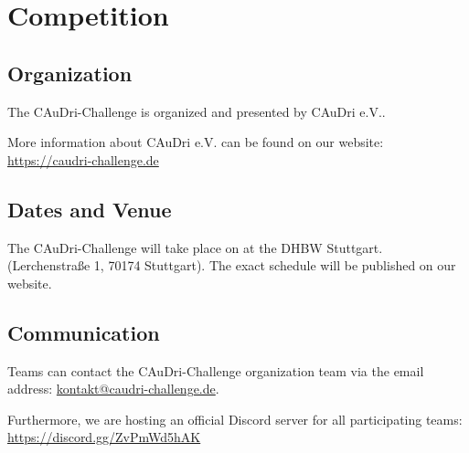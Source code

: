 \chapter{Competition}

\section{Organization}

The CAuDri-Challenge is organized and presented by CAuDri e.V..

More information about CAuDri e.V. can be found on our website:
\href{https://caudri-challenge.de}{https://caudri-challenge.de}



\section{Dates and Venue}

The CAuDri-Challenge \yearofchallenge{} will take place on \dateofchallenge{}
at the DHBW Stuttgart. (Lerchenstraße 1, 70174 Stuttgart). The exact schedule
will be published on our website.

\section{Communication}

Teams can contact the CAuDri-Challenge organization team via the email address:
\newline
\href{mailto:kontakt@caudri-challenge.de}{kontakt@caudri-challenge.de}.

Furthermore, we are hosting an official Discord server for all participating
teams:\newline
\href{https://discord.gg/ZvPmWd5hAK}{https://discord.gg/ZvPmWd5hAK}